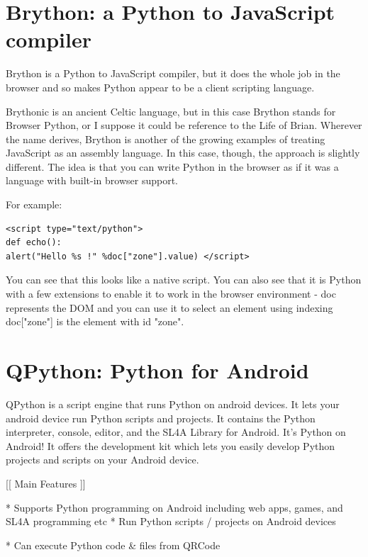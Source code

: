\newpage
\section{Brython: a Python to JavaScript compiler}

Brython is a Python to JavaScript compiler, but it does the whole job in the browser and so makes Python appear to be a client scripting language. 

Brythonic is an ancient Celtic language, but in this case Brython stands for Browser Python, or I suppose it could be reference to the Life of Brian. Wherever the name derives, Brython is another of the growing examples of treating JavaScript as an assembly language. In this case, though, the approach is slightly different. The idea is that you can write Python in the browser as if it was a language with built-in browser support. 

For example:

\begin{lstlisting}
<script type="text/python">
def echo():
alert("Hello %s !" %doc["zone"].value) </script>
\end{lstlisting}

You can see that this looks like a native script. You can also see that it is Python with a few extensions to enable it to work in the browser environment - doc represents the DOM and you can use it to select an element using indexing doc["zone"] is the element with id "zone". 








\newpage
\section{QPython: Python for Android}

QPython is a script engine that runs Python on android devices. It lets your android device run Python scripts and projects. It contains the Python interpreter, console, editor, and the SL4A Library for Android. It’s Python on Android! It offers the development kit which lets you easily develop Python projects and scripts on your Android device.


[[ Main Features ]] 

* Supports Python programming on Android including web apps, games, and SL4A programming etc * Run Python scripts / projects on Android devices 

* Can execute Python code \& files from QRCode 

